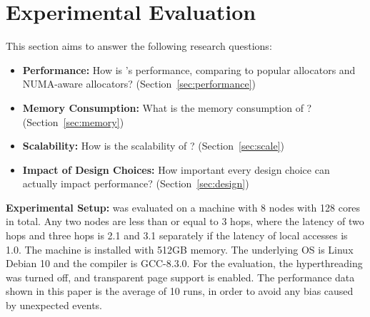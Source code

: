 \section{Experimental Evaluation}
\label{sec:evaluation}

This section aims to answer the following research questions: 

\begin{itemize}
\item \textbf{Performance:} How is \NM{}'s performance, comparing to popular allocators and NUMA-aware allocators? (Section~\ref{sec:performance}) 
\item \textbf{Memory Consumption:} What is the memory consumption of \NM{}? (Section~\ref{sec:memory})
\item \textbf{Scalability:} How is the scalability of \NM{}? (Section~\ref{sec:scale})
\item \textbf{Impact of Design Choices:} How important every design choice can actually impact performance? (Section~\ref{sec:design})	
\end{itemize}

\textbf{Experimental Setup:}  \NM{} was evaluated on a machine with 8 nodes with 128 cores in total. Any two nodes are less than or equal to 3 hops, where the latency of two hops and three hops is 2.1 and 3.1 separately if the latency of local accesses is 1.0. The machine is installed with 512GB memory. The underlying OS is Linux Debian 10 and the compiler is GCC-8.3.0. For the evaluation, the hyperthreading was turned off, and transparent page support is enabled. The performance data shown in this paper is the average of 10 runs, in order to avoid any bias caused by unexpected events.  

